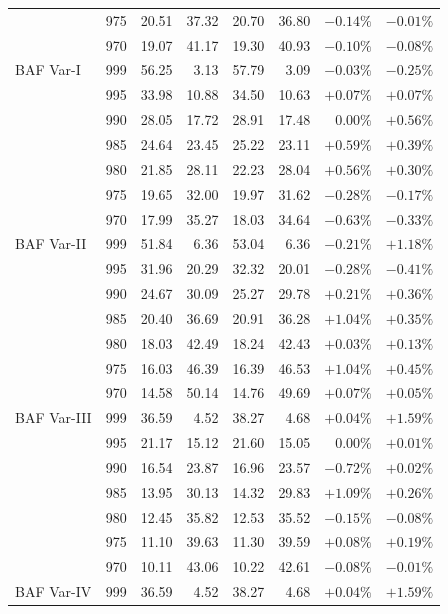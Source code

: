 \documentclass[11pt]{article}
\begin{document}
\begin{table}[t]
\begin{tabular}{llrrrrrr}
 & 975 & 20.51 & 37.32 & 20.70 & 36.80 & $-0.14\%$ & $-0.01\%$ \\
 & 970 & 19.07 & 41.17 & 19.30 & 40.93 & $-0.10\%$ & $-0.08\%$ \\
\midrule
BAF Var-I & 999 & 56.25 & 3.13 & 57.79 & 3.09 & $-0.03\%$ & $-0.25\%$ \\
 & 995 & 33.98 & 10.88 & 34.50 & 10.63 & $+0.07\%$ & $+0.07\%$ \\
 & 990 & 28.05 & 17.72 & 28.91 & 17.48 & $0.00\%$ & $+0.56\%$ \\
 & 985 & 24.64 & 23.45 & 25.22 & 23.11 & $+0.59\%$ & $+0.39\%$ \\
 & 980 & 21.85 & 28.11 & 22.23 & 28.04 & $+0.56\%$ & $+0.30\%$ \\
 & 975 & 19.65 & 32.00 & 19.97 & 31.62 & $-0.28\%$ & $-0.17\%$ \\
 & 970 & 17.99 & 35.27 & 18.03 & 34.64 & $-0.63\%$ & $-0.33\%$ \\
\midrule
BAF Var-II & 999 & 51.84 & 6.36 & 53.04 & 6.36 & $-0.21\%$ & $+1.18\%$ \\
 & 995 & 31.96 & 20.29 & 32.32 & 20.01 & $-0.28\%$ & $-0.41\%$ \\
 & 990 & 24.67 & 30.09 & 25.27 & 29.78 & $+0.21\%$ & $+0.36\%$ \\
 & 985 & 20.40 & 36.69 & 20.91 & 36.28 & $+1.04\%$ & $+0.35\%$ \\
 & 980 & 18.03 & 42.49 & 18.24 & 42.43 & $+0.03\%$ & $+0.13\%$ \\
 & 975 & 16.03 & 46.39 & 16.39 & 46.53 & $+1.04\%$ & $+0.45\%$ \\
 & 970 & 14.58 & 50.14 & 14.76 & 49.69 & $+0.07\%$ & $+0.05\%$ \\
\midrule
BAF Var-III & 999 & 36.59 & 4.52 & 38.27 & 4.68 & $+0.04\%$ & $+1.59\%$ \\
 & 995 & 21.17 & 15.12 & 21.60 & 15.05 & $0.00\%$ & $+0.01\%$ \\
 & 990 & 16.54 & 23.87 & 16.96 & 23.57 & $-0.72\%$ & $+0.02\%$ \\
 & 985 & 13.95 & 30.13 & 14.32 & 29.83 & $+1.09\%$ & $+0.26\%$ \\
 & 980 & 12.45 & 35.82 & 12.53 & 35.52 & $-0.15\%$ & $-0.08\%$ \\
 & 975 & 11.10 & 39.63 & 11.30 & 39.59 & $+0.08\%$ & $+0.19\%$ \\
 & 970 & 10.11 & 43.06 & 10.22 & 42.61 & $-0.08\%$ & $-0.01\%$ \\
\midrule
BAF Var-IV & 999 & 36.59 & 4.52 & 38.27 & 4.68 & $+0.04\%$ & $+1.59\%$ \\

\end{tabular}
\end{table}
\end{document}
